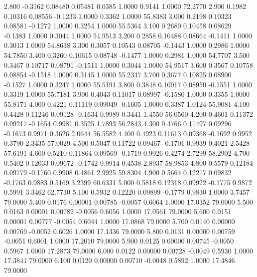    2.800  -0.3162   0.08480   0.05481   0.0385   1.0000   0.9141   1.0000  72.2770
   2.900   0.1982   0.10316   0.08556  -0.1233   1.0000   0.3362   1.0000  55.8383
   3.000   0.2198   0.10323   0.08581  -0.1272   1.0000   0.3254   1.0000  55.5364
   3.100   0.2680   0.10458   0.08629  -0.1383   1.0000   0.3044   1.0000  54.9513
   3.200   0.2858   0.10488   0.08664  -0.1411   1.0000   0.3013   1.0000  54.8638
   3.300   0.3057   0.10543   0.08705  -0.1443   1.0000   0.2986   1.0000  54.7850
   3.400   0.3260   0.10615   0.08748  -0.1477   1.0000   0.2981   1.0000  54.7707
   3.500   0.3467   0.10717   0.08791  -0.1511   1.0000   0.3044   1.0000  54.9517
   3.600   0.3567   0.10758   0.08854  -0.1518   1.0000   0.3145   1.0000  55.2347
   3.700   0.3677   0.10825   0.08900  -0.1527   1.0000   0.3247   1.0000  55.5191
   3.800   0.3848   0.10917   0.08950  -0.1551   1.0000   0.3319   1.0000  55.7181
   3.900   0.4043   0.11017   0.08997  -0.1580   1.0000   0.3355   1.0000  55.8171
   4.000   0.4221   0.11119   0.09049  -0.1605   1.0000   0.3387   1.0124  55.9081
   4.100   0.4428   0.11246   0.09128  -0.1634   0.9989   0.3441   1.4550  56.0560
   4.200   0.4601   0.11372   0.09217  -0.1654   0.9981   0.3525   1.7893  56.2843
   4.300   0.4766   0.11497   0.09296  -0.1673   0.9971   0.3626   2.0644  56.5582
   4.400   0.4923   0.11613   0.09368  -0.1692   0.9952   0.3790   2.3435  57.0029
   4.500   0.5047   0.11722   0.09467  -0.1701   0.9939   0.4021   2.5428  57.6191
   4.600   0.5210   0.11864   0.09569  -0.1719   0.9926   0.4274   2.7299  58.2902
   4.700   0.5402   0.12033   0.09672  -0.1742   0.9914   0.4538   2.8937  58.9853
   4.800   0.5579   0.12184   0.09779  -0.1760   0.9908   0.4861   2.9925  59.8304
   4.900   0.5664   0.12217   0.09832  -0.1763   0.9883   0.5169   3.2399  60.6331
   5.000   0.5818   0.12318   0.09922  -0.1775   0.9872   0.5991   3.3462  62.7730
   5.100   0.5932   0.12220   0.09899  -0.1779   0.9830   1.0000   3.7457  79.0000
   5.400   0.0176   0.00001   0.00785  -0.0057   0.6064   1.0000  17.0352  79.0000
   5.500   0.0163   0.00001   0.00782  -0.0056   0.6056   1.0000  17.0561  79.0000
   5.600   0.0151   0.00001   0.00777  -0.0054   0.6044   1.0000  17.0868  79.0000
   5.700   0.0140   0.00000   0.00769  -0.0052   0.6026   1.0000  17.1336  79.0000
   5.800   0.0131   0.00000   0.00759  -0.0051   0.6001   1.0000  17.2010  79.0000
   5.900   0.0125   0.00000   0.00745  -0.0050   0.5967   1.0000  17.2873  79.0000
   6.000   0.0122   0.00000   0.00728  -0.0049   0.5930   1.0000  17.3841  79.0000
   6.100   0.0120   0.00000   0.00710  -0.0048   0.5892   1.0000  17.4846  79.0000
